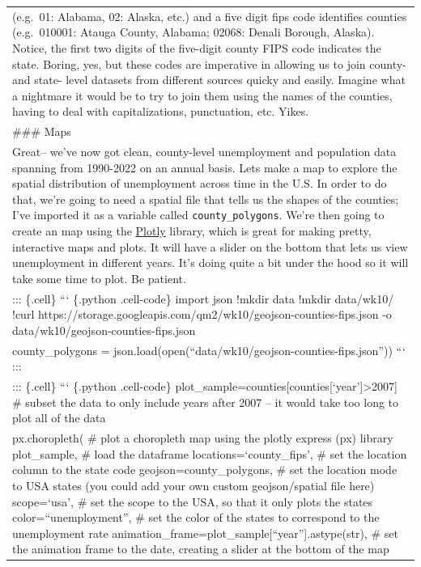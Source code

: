 \documentclass[
  letterpaper,
  DIV=11,
  numbers=noendperiod]{scrreprt}
\begin{document}
\begin{longtable}[]{@{}
  >{\raggedright\arraybackslash}p{}@{}}
(e.g.~01: Alabama, 02: Alaska, etc.) and a five digit fips code
identifies counties (e.g.~010001: Atauga County, Alabama; 02068: Denali
Borough, Alaska). Notice, the first two digits of the five-digit county
FIPS code indicates the state. Boring, yes, but these codes are
imperative in allowing us to join county- and state- level datasets from
different sources quicky and easily. Imagine what a nightmare it would
be to try to join them using the names of the counties, having to deal
with capitalizations, punctuation, etc. Yikes. \\
\#\#\# Maps \\
Great-- we've now got clean, county-level unemployment and population
data spanning from 1990-2022 on an annual basis. Lets make a map to
explore the spatial distribution of unemployment across time in the U.S.
In order to do that, we're going to need a spatial file that tells us
the shapes of the counties; I've imported it as a variable called
\texttt{county\_polygons}. We're then going to create an map using the
\href{https://plotly.com/python/}{Plotly} library, which is great for
making pretty, interactive maps and plots. It will have a slider on the
bottom that lets us view unemployment in different years. It's doing
quite a bit under the hood so it will take some time to plot. Be
patient. \\
::: \{.cell\} ``` \{.python .cell-code\} import json !mkdir data !mkdir
data/wk10/ !curl
https://storage.googleapis.com/qm2/wk10/geojson-counties-fips.json -o
data/wk10/geojson-counties-fips.json \\
county\_polygons =
json.load(open(``data/wk10/geojson-counties-fips.json'')) ``` ::: \\
::: \{.cell\} ``` \{.python .cell-code\}
plot\_sample=counties{[}counties{[}`year'{]}\textgreater2007{]} \#
subset the data to only include years after 2007 -- it would take too
long to plot all of the data \\
px.choropleth( \# plot a choropleth map using the plotly express (px)
library plot\_sample, \# load the dataframe locations=`county\_fips', \#
set the location column to the state code geojson=county\_polygons, \#
set the location mode to USA states (you could add your own custom
geojson/spatial file here) scope=`usa', \# set the scope to the USA, so
that it only plots the states color=``unemployment'', \# set the color
of the states to correspond to the unemployment rate
animation\_frame=plot\_sample{[}``year''{]}.astype(str), \# set the
animation frame to the date, creating a slider at the bottom of the map

\end{longtable}
\end{document}

